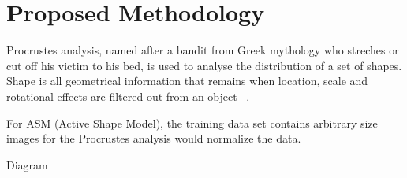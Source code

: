 \chapter{Proposed Methodology}

Procrustes analysis, named after a bandit from Greek mythology who streches or cut off his victim to his bed, is used to analyse the distribution of a set of shapes. Shape is all geometrical information that remains when location, scale and rotational effects are filtered out from an object ~\cite{IMM2002-0403}. 

For ASM (Active Shape Model), the training data set contains arbitrary size images for the Procrustes analysis would normalize the data.

Diagram 
